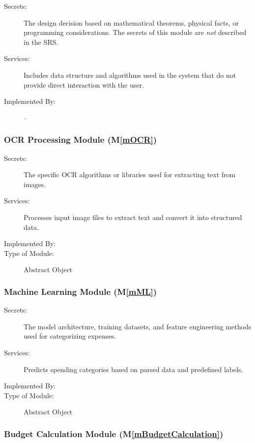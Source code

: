 \documentclass[12pt, titlepage]{article}
\newcommand{\mref}[1]{M\ref{#1}}
\begin{document}
\begin{description}
\item[Secrets:] The design decision based on mathematical theorems, physical
  facts, or programming considerations. The secrets of this module are
  \emph{not} described in the SRS.
\item[Services:] Includes data structure and algorithms used in the system that
  do not provide direct interaction with the user. 
\item[Implemented By:] --
\end{description}

\subsubsection{OCR Processing Module (\mref{mOCR})}

\begin{description}
\item[Secrets:] The specific OCR algorithms or libraries used for extracting text from images.
\item[Services:] Processes input image files to extract text and convert it into structured data.
\item[Implemented By:] \progname
\item[Type of Module:] Abstract Object
\end{description}

\subsubsection{Machine Learning Module (\mref{mML})}

\begin{description}
\item[Secrets:] The model architecture, training datasets, and feature engineering methods used for categorizing expenses.
\item[Services:] Predicts spending categories based on parsed data and predefined labels.
\item[Implemented By:] \progname
\item[Type of Module:] Abstract Object
\end{description}

\subsubsection{Budget Calculation Module (\mref{mBudgetCalculation})}
\end{document}
